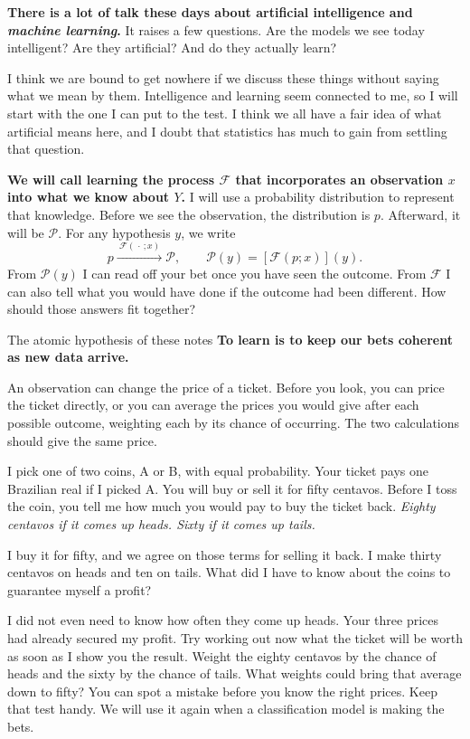 \textbf{There is a lot of talk these days about artificial intelligence and \emph{machine learning}.} It raises a few questions. Are the models we see today intelligent? Are they artificial? And do they actually learn?

I think we are bound to get nowhere if we discuss these things without saying what we mean by them. Intelligence and learning seem connected to me, so I will start with the one I can put to the test. I think we all have a fair idea of what artificial means here, and I doubt that statistics has much to gain from settling that question.

\textbf{We will call learning the process \(\mathcal F\) that incorporates an observation \(x\) into what we know about \(Y\).} I will use a probability distribution to represent that knowledge. Before we see the observation, the distribution is \(p\). Afterward, it will be \(\mathcal P\). For any hypothesis \(y\), we write
\[
 p \xrightarrow{\ \mathcal F(\,\cdot\,;x)\ } \mathcal P,
 \qquad \mathcal P(y)=[\mathcal F(p;x)](y).
\]
From $\mathcal P(y)$ I can read off your bet once you have seen the outcome. From $\mathcal F$ I can also tell what you would have done if the outcome had been different. How should those answers fit together?

\begin{quadro}{The atomic hypothesis of these notes}
\textbf{To learn is to keep our bets coherent as new data arrive.}

An observation can change the price of a ticket. Before you look, you can price the ticket directly, or you can average the prices you would give after each possible outcome, weighting each by its chance of occurring. The two calculations should give the same price.
\end{quadro}

I pick one of two coins, A or B, with equal probability. Your ticket pays one Brazilian real if I picked A. You will buy or sell it for fifty centavos. Before I toss the coin, you tell me how much you would pay to buy the ticket back. \emph{Eighty centavos if it comes up heads. Sixty if it comes up tails.}

I buy it for fifty, and we agree on those terms for selling it back. I make thirty centavos on heads and ten on tails. What did I have to know about the coins to guarantee myself a profit?

I did not even need to know how often they come up heads. Your three prices had already secured my profit. Try working out now what the ticket will be worth as soon as I show you the result. Weight the eighty centavos by the chance of heads and the sixty by the chance of tails. What weights could bring that average down to fifty? You can spot a mistake before you know the right prices. Keep that test handy. We will use it again when a classification model is making the bets.

